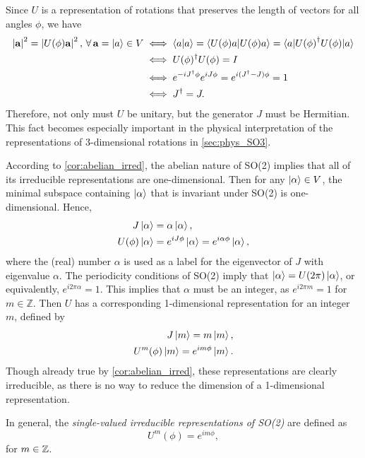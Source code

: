 Since $U$ is a representation of rotations that preserves the length of vectors for all angles $\phi$, we have
\begin{align*}
    \left|\mathbf{a}\right|^2 = \left|U(\phi)\mathbf{a}\right|^2, \, \forall\, \mathbf{a}=\ket{a}\in V &\iff \braket{a|a} = \braket{U(\phi)a|U(\phi)a} = \braket{a|{U(\phi)}^\dagger U(\phi)|a} \\
    &\iff U(\phi)^\dagger U(\phi) = I \\
    &\iff e^{-iJ^\dagger\phi}e^{iJ\phi} = e^{i(J^\dagger-J)\phi} = 1 \\
    &\iff J^\dagger = J.
\end{align*}
Therefore, not only must $U$ be unitary, but the generator $J$ must be Hermitian. This fact becomes especially important in the physical interpretation of the representations of 3-dimensional rotations in \cref{sec:phys_SO3}.

According to \cref{cor:abelian_irred}, the abelian nature of SO(2) implies that all of its irreducible representations are one-dimensional. Then for any $\ket{\alpha}\in V$, the minimal subspace containing $\ket{\alpha}$ that is invariant under SO(2) is one-dimensional. Hence,
\begin{align*}
    J\ket{\alpha} &= \alpha\ket{\alpha}, \\
    U(\phi)\ket{\alpha} &= e^{iJ\phi}\ket{\alpha} = e^{i\alpha\phi}\ket{\alpha},
\end{align*}
where the (real) number $\alpha$ is used as a label for the eigenvector of $J$ with eigenvalue $\alpha$. The periodicity conditions of SO(2) imply that $\ket{\alpha} = U(2\pi)\ket{\alpha}$, or equivalently, $e^{i2\pi\alpha} = 1$. This implies that $\alpha$ must be an integer, as $e^{i2\pi m} = 1$ for $m\in\mathbb{Z}$. Then $U$ has a corresponding 1-dimensional representation for an integer $m$, defined by
\begin{align*}
    J\ket{m} = m\ket{m}, \\
    U^m(\phi)\ket{m} = e^{im\phi}\ket{m}.
\end{align*}
Though already true by \cref{cor:abelian_irred}, these representations are clearly irreducible, as there is no way to reduce the dimension of a 1-dimensional representation.

In general, the \textit{single-valued irreducible representations of SO(2)} are defined as
\begin{equation}
    U^m(\phi) = e^{im\phi},
\end{equation}
for $m\in\mathbb{Z}$.

